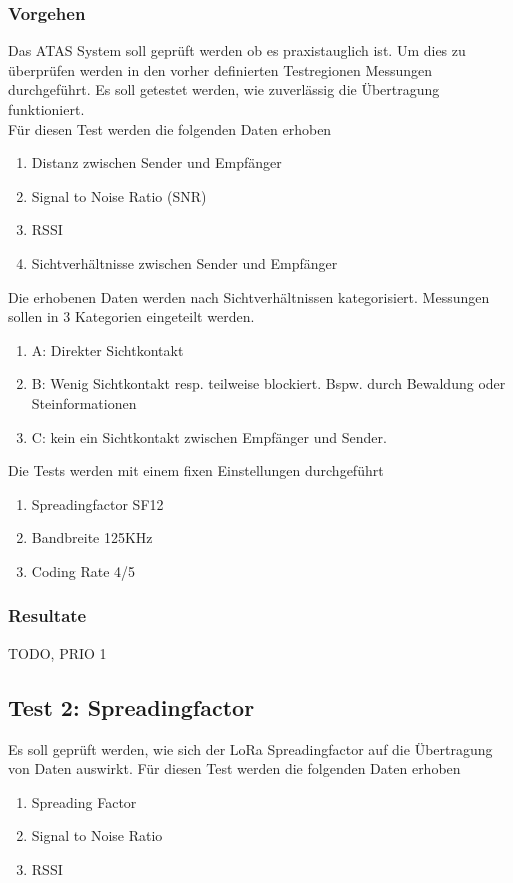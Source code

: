\documentclass[11pt,english,german]{report}
\theoremstyle{definition}
\begin{document}
\subsubsection{Vorgehen}
Das ATAS System soll geprüft werden ob es praxistauglich ist. Um dies zu überprüfen werden in den vorher definierten Testregionen Messungen durchgeführt. Es soll getestet werden, wie zuverlässig die Übertragung funktioniert.\\[0.3cm]
Für diesen Test werden die folgenden Daten erhoben
\begin{enumerate}
	\item Distanz zwischen Sender und Empfänger
	\item Signal to Noise Ratio (SNR)
	\item RSSI
	\item Sichtverhältnisse zwischen Sender und Empfänger
\end{enumerate}	
Die erhobenen Daten werden nach Sichtverhältnissen kategorisiert. Messungen sollen in 3 Kategorien eingeteilt werden.
\begin{enumerate}
	\item A: Direkter Sichtkontakt
	\item B: Wenig Sichtkontakt resp. teilweise blockiert. Bspw. durch Bewaldung oder Steinformationen
	\item C: kein ein Sichtkontakt zwischen Empfänger und Sender.
\end{enumerate}
Die Tests werden mit einem fixen Einstellungen durchgeführt
\begin{enumerate}
	\item Spreadingfactor SF12
	\item Bandbreite 125KHz
	\item Coding Rate 4/5
\end{enumerate}
\newpage
\subsubsection{Resultate}
TODO, PRIO 1

\newpage
\subsection{Test 2: Spreadingfactor}
Es soll geprüft werden, wie sich der LoRa Spreadingfactor auf die Übertragung von Daten auswirkt.
Für diesen Test werden die folgenden Daten erhoben
\begin{enumerate}
	\item Spreading Factor
	\item Signal to Noise Ratio
	\item RSSI
\end{enumerate}
\end{document}
